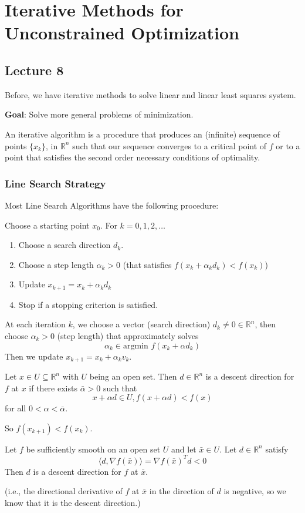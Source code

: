 \section{Iterative Methods for Unconstrained Optimization}
\subsection{Lecture 8}
Before, we have iterative methods to solve linear and linear least squares system.

\textbf{Goal}: Solve more general problems of minimization.

An iterative algorithm is a procedure that produces an (infinite) sequence of points $\{x_k\}$, in $\mathbb R^n$ such that our sequence converges to a critical point of $f$ or to a point that satisfies the second order necessary conditions of optimality.

\subsubsection{Line Search Strategy}
Most Line Search Algorithms have the following procedure:

Choose a starting point $x_0$. For $k = 0,1,2,\ldots$
\begin{enumerate}
  \item Choose a search direction $d_k$.
  \item Choose a step length $\alpha_k > 0$ (that satisfies $f(x_k + \alpha_k d_k) < f(x_k)$)
  \item Update $x_{k+1} = x_k + \alpha_k d_k$
  \item Stop if a stopping criterion is satisfied.
\end{enumerate}
\begin{definition}
  At each iteration $k$, we choose a vector (search direction) $d_k \neq 0 \in \mathbb R^n$, then choose $\alpha_k > 0$ (step length) that approximately solves
$$\alpha_k \in \text{argmin } f(x_k + \alpha d_k)$$
Then we update $x_{k+1} = x_k + \alpha_k v_k$.
\end{definition}
\begin{definition}
  Let $x \in U \subseteq \mathbb R^n$ with $U$ being an open set. Then $d \in \mathbb R^n$ is a descent direction for $f$ at $x$ if there exists $\bar \alpha > 0$ such that $$x + \alpha d \in U, f(x + \alpha d) < f(x)$$ for all $0 < \alpha < \bar \alpha$.

  \bigskip So $f(x_{k+1}) < f(x_k)$.
\end{definition}
\begin{lemma}
  Let $f$ be sufficiently smooth on an open set $U$ and let $\bar x \in U$. Let $d \in \mathbb R^n$ satisfy $$\langle d, \nabla f(\bar x) \rangle = \nabla f(\bar x)^T d < 0$$ Then $d$ is a descent direction for $f$ at $\bar x$.

  \bigskip (i.e., the directional derivative of $f$ at $\bar x$ in the direction of $d$ is negative, so we know that it is the descent direction.)
\end{lemma}

